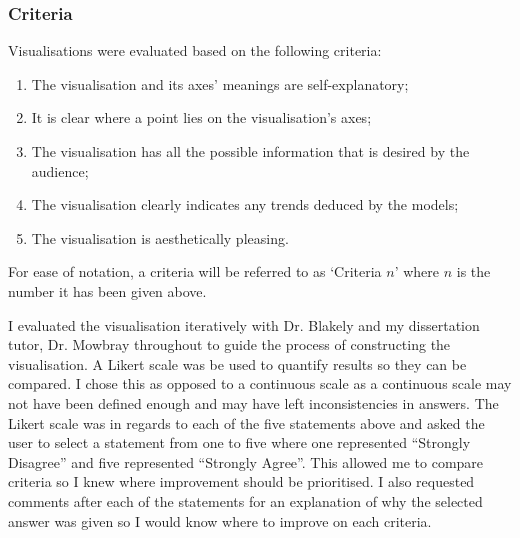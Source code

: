 			\subsubsection{Criteria}
				Visualisations were evaluated based on the following criteria:
				\begin{enumerate}				
					\item The visualisation and its axes' meanings are self-explanatory;
					\item It is clear where a point lies on the visualisation's axes;
					\item The visualisation has all the possible information that is desired by the audience;
					\item The visualisation clearly indicates any trends deduced by the models;
					\item The visualisation is aesthetically pleasing.					
				\end{enumerate}
				For ease of notation, a criteria will be referred to as `Criteria $n$' where $n$ is the number it has been given above.
				
				I evaluated the visualisation iteratively with Dr. Blakely and my dissertation tutor, Dr. Mowbray throughout to guide the process of constructing the visualisation. A Likert scale was be used to quantify results so they can be compared. I chose this as opposed to a continuous scale as a continuous scale may not have been defined enough and may have left inconsistencies in answers. The Likert scale was in regards to each of the five statements above and asked the user to select a statement from one to five where one represented ``Strongly Disagree'' and five represented ``Strongly Agree''. This allowed me to compare criteria so I knew where improvement should be prioritised. I also requested comments after each of the statements for an explanation of why the selected answer was given so I would know where to improve on each criteria.

